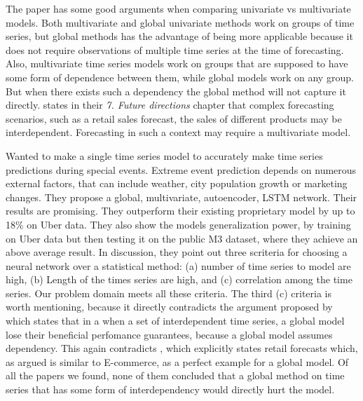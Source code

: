 The paper \cite{Rabanser2020} has some good arguments when comparing univariate vs multivariate models.
Both multivariate and global univariate methods work on groups of time series, but global methods
has the advantage of being more applicable because it does not require observations of multiple
time series at the time of forecasting.
Also, multivariate time series models work on groups that are supposed to have some form of 
dependence between them, while global models work on any group.
But when there exists such a dependency the global method will not capture it directly.
\cite{Hewamalage2021} states in their \textit{7. Future directions} chapter that complex
forecasting scenarios, such as a retail sales forecast, the sales of different products
may be interdependent.
Forecasting in such a context may require a multivariate model.

\cite{Laptev}
Wanted to make a single time series model to
accurately make time series predictions during special events.
Extreme event prediction depends on numerous external factors,
that can include weather, city population growth or marketing
changes.
They propose a global, multivariate, autoencoder, LSTM network.
Their results are promising. They outperform their existing
proprietary model by up to 18\% on Uber data.
They also show the models generalization power, by training on Uber data
but then testing it on the public M3 dataset, where they achieve an above average result.
In \cite{Laptev} discussion, they point out three scriteria for 
choosing a neural network over a statistical method:
(a) number of time series to model are high, (b) Length of the 
times series are high, and (c) correlation among the time series.
Our problem domain meets all these criteria. 
The third (c) criteria is worth mentioning, because it directly
contradicts the argument proposed by \cite{Montero-Manso2021}%
which states that in a when a set of interdependent time series,
a global model lose their beneficial perfomance guarantees,
because a global model assumes dependency.
This again contradicts \cite{Hewamalage2021}, which explicitly states
retail forecasts which, as argued is similar to E-commerce,
as a perfect example for a global model.
Of all the papers we found, none of them concluded that a global method
on time series that has some form of interdependency would directly hurt the model.



